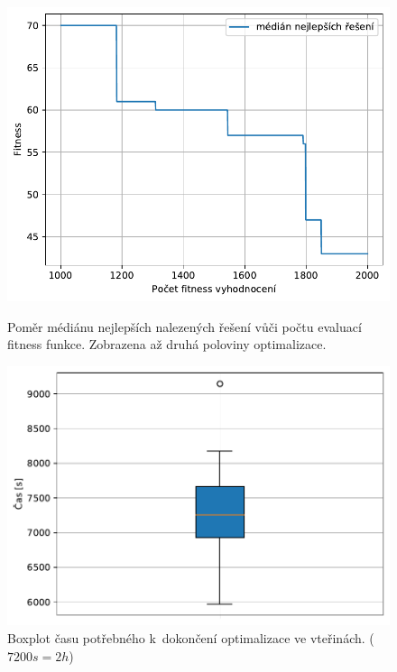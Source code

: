 \begin{figure}[H]
\begin{minipage}[t]{0.475\linewidth}
	\includegraphics[width=\textwidth]{obrazky-figures/statistics/HIFU/blob/4/SA/bestsToFitness_1.pdf}
	\caption{Poměr médiánu nejlepších nalezených řešení vůči počtu evaluací fitness funkce.  Zobrazena až druhá poloviny optimalizace.}
	\label{fg:hifu:sa:fitPerf}
\end{minipage}
\hfill
\begin{minipage}[t]{0.475\linewidth}
\includegraphics[width=\linewidth]{obrazky-figures/statistics/HIFU/blob/4/SA/timeBoxplot_WithOutliers.pdf}
\caption{Boxplot času potřebného k~dokončení optimalizace ve vteřinách. ($7200s = 2h$)}
\label{fg:hifu:sa:time}
\end{minipage}
\end{figure}



